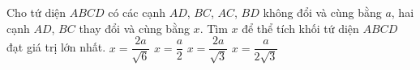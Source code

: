 \begin{vd}%
	Cho tứ diện $ABCD$ có các cạnh $AD$, $BC$, $AC$, $BD$ không đổi và cùng bằng $a$, hai cạnh $AD$, $BC$ thay đổi và cùng bằng $x$. Tìm $x$ để thể tích khối tứ diện $ABCD$ đạt giá trị lớn nhất.
	\choice
	{$x=\dfrac{2a}{\sqrt{6}} $}
	{$x=\dfrac{a}{2} $}
	{\True $x=\dfrac{2a}{\sqrt{3}} $}
	{$x=\dfrac{a}{2\sqrt{3}} $}
\end{vd}


